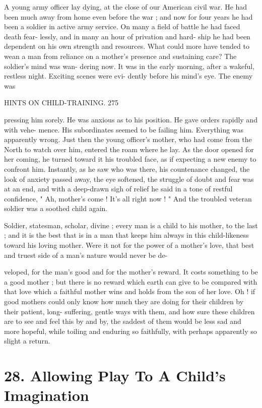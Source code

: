 \documentclass[
]{book}
\begin{document}
A young army officer lay dying, at the close of our American civil war. He had been much away from home even before the war ; and now for four years he had been a soldier in active army service. On many a field of battle he had faced death fear- lessly, and in many an hour of privation and hard- ship he had been dependent on his own strength and resources. What could more have tended to wean a man from reliance on a mother's presence and sustaining care? The soldier's mind was wan- dering now. It was in the early morning, after a wakeful, restless night. Exciting scenes were evi- dently before his mind's eye. The enemy was

HINTS ON CHILD-TRAINING. 275

pressing him sorely. He was anxious as to his position. He gave orders rapidly and with vehe- mence. His subordinates seemed to be failing him. Everything was apparently wrong. Just then the young officer's mother, who had come from the North to watch over him, entered the roam where he lay. As the door opened for her coming, he turned toward it his troubled face, as if expecting a new enemy to confront him. Instantly, as he saw who was there, his countenance changed, the look of anxiety passed away, the eye softened, the struggle of doubt and fear was at an end, and with a deep-drawn sigh of relief he said in a tone of restful confidence, " Ah, mother's come ! It's all right now ! " And the troubled veteran soldier was a soothed child again.

Soldier, statesman, scholar, divine ; every man is a child to his mother, to the last ; and it is the best that is in a man that keeps him always in this child-likeness toward his loving mother. Were it not for the power of a mother's love, that best and truest side of a man's nature would never be de-

veloped, for the man's good and for the mother's reward. It costs something to be a good mother ; but there is no reward which earth can give to be compared with that love which a faithful mother wins and holds from the son of her love. Oh ! if good mothers could only know how much they are doing for their children by their patient, long- suffering, gentle ways with them, and how sure these children are to see and feel this by and by, the saddest of them would be less sad and more hopeful, while toiling and enduring so faithfully, with perhaps apparently so slight a return.

\hypertarget{allowing-play-to-a-childs-imagination}{%
\chapter{28. Allowing Play To A Child's Imagination}\label{allowing-play-to-a-childs-imagination}}
\end{document}
